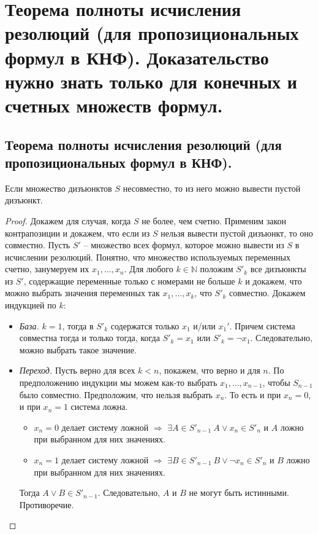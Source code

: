 \section{Теорема полноты исчисления резолюций (для пропозициональных формул в КНФ). Доказательство нужно знать только для конечных и счетных множеств формул.}

\subsection{Теорема полноты исчисления резолюций (для пропозициональных формул в КНФ).}

\begin{theorem}
  Если множество дизъюнктов $S$ несовместно, то из него можно вывести пустой дизъюнкт.
  \begin{proof}
    Докажем для случая, когда $S$ не более, чем счетно. \newline
    Применим закон контрапозиции и докажем, что если из $S$ нельзя вывести пустой дизъюнкт, то оно совместно. \newline
    Пусть $S'$ -- множество всех формул, которое можно вывести из $S$ в исчислении резолюций. Понятно, что множество используемых переменных счетно, занумеруем их $x_1, \dots, x_n$. Для любого $k \in \mathbb{N}$ положим $S'_k$ все дизъюнкты из $S'$, содержащие переменные только с номерами не больше $k$ и докажем, что можно выбрать значения переменных так $x_1, \dots, x_k$, что $S'_k$ совместно. Докажем индукцией по $k$: \newline
    \begin{itemize}
      \item \textit{База.} $k=1$, тогда в $S'_k$ содержатся только $x_1$ и/или $x_1'$. Причем система совместна тогда и только тогда, когда $S'_k = x_1$ или $S'_k = \neg x_1$. Следовательно, можно выбрать такое значение.
      \item \textit{Переход.} Пусть верно для всех $k < n$, покажем, что верно и для $n$. По предположению индукции мы можем как-то выбрать $x_1, \dots, x_{n-1}$, чтобы $S_{n-1}$ было совместно. Предположим, что нельзя выбрать $x_n$. То есть и при $x_n=0$, и при $x_n=1$ система ложна.
      \begin{itemize}
        \item $x_n = 0$ делает систему ложной $\Rightarrow$ $\exists A \in S'_{n-1} \> A \vee x_n \in S'_n$ и $A$ ложно при выбранном для них значениях.
        \item $x_n = 1$ делает систему ложной $\Rightarrow$ $\exists B \in S'_{n-1} \> B \vee \neg x_n \in S'_n$ и $B$ ложно при выбранном для них значениях.
      \end{itemize}
      Тогда $A \vee B \in S'_{n-1}$. Следовательно, $A$ и $B$ не могут быть истинными. Противоречие.
    \end{itemize}
  \end{proof}
\end{theorem}